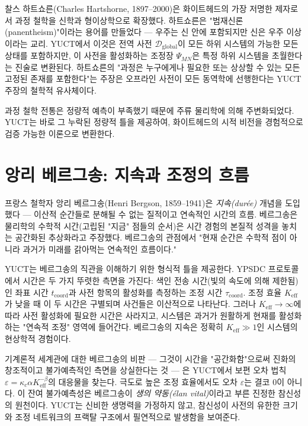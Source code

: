 \documentclass[12pt,a4paper]{article}
\begin{document}
	찰스 하트쇼른(Charles Hartshorne, 1897–2000)은 화이트헤드의 가장 저명한 제자로서 과정 철학을 신학과 형이상학으로 확장했다. 하트쇼른은 "범재신론(panentheism)"이라는 용어를 만들었다 — 우주는 신 안에 포함되지만 신은 우주 이상이라는 교리. YUCT에서 이것은 전역 사전 \(\mathcal{D}_{\text{global}}\)이 모든 하위 시스템의 가능한 모든 상태를 포함하지만, 이 사전을 활성화하는 조정장 \(\Psi_{MN}\)은 특정 하위 시스템을 초월한다는 진술로 변환된다. 하트쇼른의 "과정은 누구에게나 필요한 또는 상상할 수 있는 모든 고정된 존재를 포함한다"는 주장은 오프라인 사전이 모든 동역학에 선행한다는 YUCT 주장의 철학적 유사체이다.
	
	과정 철학 전통은 정량적 예측이 부족했기 때문에 주류 물리학에 의해 주변화되었다. YUCT는 바로 그 누락된 정량적 틀을 제공하여, 화이트헤드의 시적 비전을 경험적으로 검증 가능한 이론으로 변환한다.
	
	\section{앙리 베르그송: 지속과 조정의 흐름}
	
	프랑스 철학자 앙리 베르그송(Henri Bergson, 1859–1941)은 \emph{지속(durée)} 개념을 도입했다 — 이산적 순간들로 분해될 수 없는 질적이고 연속적인 시간의 흐름. 베르그송은 물리학의 수학적 시간(고립된 "지금" 점들의 순서)은 시간 경험의 본질적 성격을 놓치는 공간화된 추상화라고 주장했다. 베르그송의 관점에서 "현재 순간은 수학적 점이 아니라 과거가 미래를 갉아먹는 연속적인 흐름이다."
	
	YUCT는 베르그송의 직관을 이해하기 위한 형식적 틀을 제공한다. YPSDC 프로토콜에서 시간은 두 가지 뚜렷한 측면을 가진다: 색인 전송 시간(빛의 속도에 의해 제한됨)인 좌표 시간 \(t_{\text{coord}}\)과 사전 항목의 활성화를 측정하는 조정 시간 \(\tau_{\text{coord}}\). 조정 효율 \(K_{\mathrm{eff}}\)가 낮을 때 이 두 시간은 구별되며 사건들은 이산적으로 나타난다. 그러나 \(K_{\mathrm{eff}} \to \infty\)에 따라 사전 활성화에 필요한 시간은 사라지고, 시스템은 과거가 원활하게 현재를 활성화하는 "연속적 조정" 영역에 들어간다. 베르그송의 지속은 정확히 \(K_{\mathrm{eff}} \gg 1\)인 시스템의 현상학적 경험이다.
	
	기계론적 세계관에 대한 베르그송의 비판 — 그것이 시간을 "공간화함"으로써 진화의 창조적이고 불가예측적인 측면을 상실한다는 것 — 은 YUCT에서 보편 오차 법칙 \(\varepsilon = \kappa_c \alpha K_{\mathrm{eff}}^{-\beta}\)의 대응물을 찾는다. 극도로 높은 조정 효율에서도 오차 \(\varepsilon\)는 결코 0이 아니다. 이 잔여 불가예측성은 베르그송이 \emph{생의 약동(élan vital)}이라고 부른 진정한 참신성의 원천이다. YUCT는 신비한 생명력을 가정하지 않고, 참신성이 사전의 유한한 크기와 조정 네트워크의 프랙탈 구조에서 필연적으로 발생함을 보여준다.
	
\end{document}
